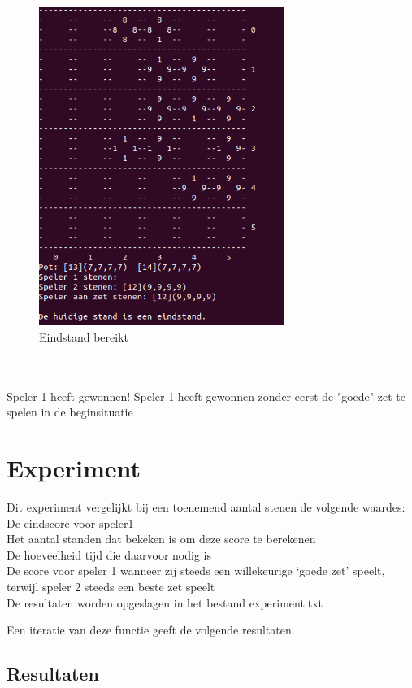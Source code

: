\documentclass{article}
\begin{document}
\begin{figure}[htp]
    \centering
    \includegraphics[width=8cm]{algo1/imgs/six_2.png}
    \caption{Eindstand bereikt}
    \label{fig:galaxy}
\end{figure}\\
\\
Speler 1 heeft gewonnen! Speler 1 heeft gewonnen zonder eerst de "goede" zet te spelen in de beginsituatie



\newpage
\section{Experiment}
Dit experiment vergelijkt bij een toenemend aantal stenen de volgende waardes: 
De eindscore voor speler1\\
Het aantal standen dat bekeken is om deze score te berekenen\\
De hoeveelheid tijd die daarvoor nodig is\\
De score voor speler 1 wanneer zij steeds een willekeurige ‘goede zet’ speelt, terwijl
speler 2 steeds een beste zet speelt \\

De resultaten worden opgeslagen in het bestand experiment.txt

Een iteratie van deze functie geeft de volgende resultaten.

\subsection{Resultaten}

\newpage
\end{document}
